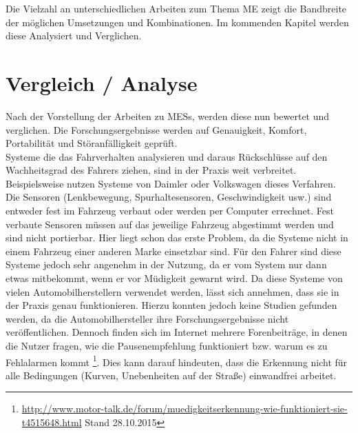 {Die Vielzahl an unterschiedlichen Arbeiten zum Thema \acl{ME} zeigt die Bandbreite der möglichen Umsetzungen und Kombinationen. Im kommenden Kapitel werden diese Analysiert und Verglichen.

\section{Vergleich / Analyse}
\label{chap:an}
Nach der Vorstellung der Arbeiten zu \acl{MESs}, werden diese nun bewertet und verglichen. Die Forschungsergebnisse werden auf Genauigkeit, Komfort,  Portabilität und Störanfälligkeit geprüft.\\

Systeme die das Fahrverhalten analysieren und daraus Rückschlüsse auf den Wachheitsgrad des Fahrers ziehen, sind in der Praxis weit verbreitet. Beispielsweise nutzen Systeme von Daimler \cite{Daimler} oder Volkswagen \cite{Bosch} dieses Verfahren. Die Sensoren (Lenkbewegung, Spurhaltesensoren, Geschwindigkeit usw.) sind entweder fest im Fahrzeug verbaut oder werden per Computer errechnet. Fest verbaute Sensoren müssen auf das jeweilige Fahrzeug abgestimmt werden und sind nicht portierbar. Hier liegt schon das erste Problem, da die Systeme nicht in einem Fahrzeug einer anderen Marke einsetzbar sind. Für den Fahrer sind diese Systeme jedoch sehr angenehm in der Nutzung, da er vom System nur dann etwas mitbekommt, wenn er vor Müdigkeit gewarnt wird. Da diese Systeme von vielen Automobilherstellern verwendet werden, lässt sich annehmen, dass sie in der Praxis genau funktionieren. Hierzu konnten jedoch keine Studien gefunden werden, da die Automobilhersteller ihre Forschungsergebnisse nicht veröffentlichen. Dennoch finden sich im Internet mehrere Forenbeiträge, in denen die Nutzer fragen, wie die Pausenempfehlung funktioniert bzw. warum es zu Fehlalarmen kommt \footnote{\url{http://www.motor-talk.de/forum/muedigkeitserkennung-wie-funktioniert-sie-t4515648.html} Stand 28.10.2015}. Dies kann darauf hindeuten, dass die Erkennung nicht für alle Bedingungen (Kurven, Unebenheiten auf der Straße) einwandfrei arbeitet. \\

}

